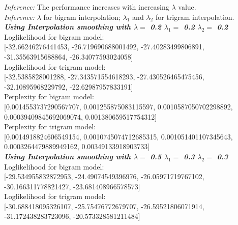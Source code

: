 \documentclass[11ppt]{article}
\begin{document}
\textit{Inference: }The performance increases with increasing $\lambda$ value.\\
\textit{Inference: } $\lambda$ for bigram interpolation; $\lambda_{1}$ and $\lambda_{2}$ for trigram interpolation.\\
\vspace{2mm}
\textit{\textbf{Using Interpolation smoothing with $\lambda = $ 0.2 $\lambda_{1} = $ 0.2 $\lambda_{2} = $ 0.2}} \\ \vspace{2mm}
Loglikelihood for bigram model: \\ \vspace{1mm}  [-32.66246276441453, -26.719690688001492, -27.40283499806891, -31.35563915688864, -26.34077593024058]  \\ \vspace{2mm}
Loglikelihood for trigram model: \\ \vspace{1mm}  [-32.5385828001288, -27.343571554618293, -27.430526465475456, -32.10895968229792, -22.62987957833191]  \\ \vspace{2mm}
Perplexity for bigram model: \\ \vspace{1mm}  [0.0014553737290567707, 0.001255875083115597, 0.0010587050702298892, 0.00039409845692069074, 0.001380659517754312]  \\ \vspace{2mm}
Perplexity for trigram model: \\ \vspace{1mm}  [0.0014918824606549154, 0.0010745074712685315, 0.001051401107345643, 0.0003264479889949162, 0.00349133918903733]  \\ \vspace{2mm}
\textit{\textbf{Using Interpolation smoothing with $\lambda = $ 0.5 $\lambda_{1} = $ 0.3 $\lambda_{2} = $ 0.3}} \\ \vspace{2mm}
Loglikelihood for bigram model: \\ \vspace{1mm}  [-29.534955832872953, -24.49074549396976, -26.05971719767102, -30.166311778821427, -23.681408966578573]  \\ \vspace{2mm}
Loglikelihood for trigram model: \\ \vspace{1mm}  [-30.688418095326107, -25.75476772679707, -26.59521806071914, -31.172438283723096, -20.573328581211484]  \\ \vspace{2mm}
\end{document}
